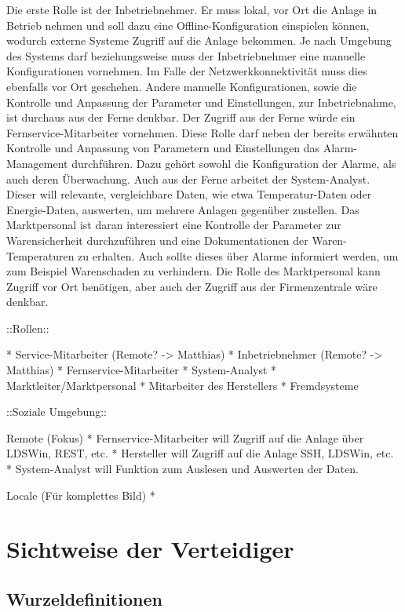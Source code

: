 \documentclass[11pt,a4paper]{report}
\begin{document}
Die erste Rolle ist der Inbetriebnehmer. Er muss lokal, vor Ort die Anlage in Betrieb nehmen und soll dazu eine Offline-Konfiguration einspielen können, wodurch externe Systeme Zugriff auf die Anlage bekommen. Je nach Umgebung des Systems darf beziehungsweise muss der Inbetriebnehmer eine manuelle Konfigurationen vornehmen. Im Falle der Netzwerkkonnektivität muss dies ebenfalls vor Ort geschehen. Andere manuelle Konfigurationen, sowie die Kontrolle und Anpassung der Parameter und Einstellungen, zur Inbetriebnahme, ist durchaus aus der Ferne denkbar. Der Zugriff aus der Ferne würde ein Fernservice-Mitarbeiter vornehmen. Diese Rolle darf neben der bereits erwähnten Kontrolle und Anpassung von Parametern und Einstellungen das Alarm-Management durchführen. Dazu gehört sowohl die Konfiguration der Alarme, als auch deren Überwachung. Auch aus der Ferne arbeitet der System-Analyst. Dieser will relevante, vergleichbare Daten, wie etwa Temperatur-Daten oder Energie-Daten, auswerten, um mehrere Anlagen gegenüber zustellen. Das Marktpersonal ist daran interessiert eine Kontrolle der Parameter zur Warensicherheit durchzuführen und eine Dokumentationen der Waren-Temperaturen zu erhalten. Auch sollte dieses über Alarme informiert werden, um zum Beispiel Warenschaden zu verhindern. Die Rolle des Marktpersonal kann Zugriff vor Ort benötigen, aber auch der Zugriff aus der Firmenzentrale wäre denkbar.



::Rollen::

* Service-Mitarbeiter (Remote? -> Matthias)
* Inbetriebnehmer (Remote? -> Matthias)
* Fernservice-Mitarbeiter 
* System-Analyst
* Marktleiter/Marktpersonal
* Mitarbeiter des Herstellers
* Fremdsysteme

::Soziale Umgebung::

Remote (Fokus)
* Fernservice-Mitarbeiter will Zugriff auf die Anlage über LDSWin, REST, etc.
* Hersteller will Zugriff auf die Anlage SSH, LDSWin, etc.
* System-Analyst will Funktion zum Auslesen und Auswerten der Daten.

Locale (Für komplettes Bild)
* 


\section{Sichtweise der Verteidiger} 

\subsection{Wurzeldefinitionen}
\end{document}
